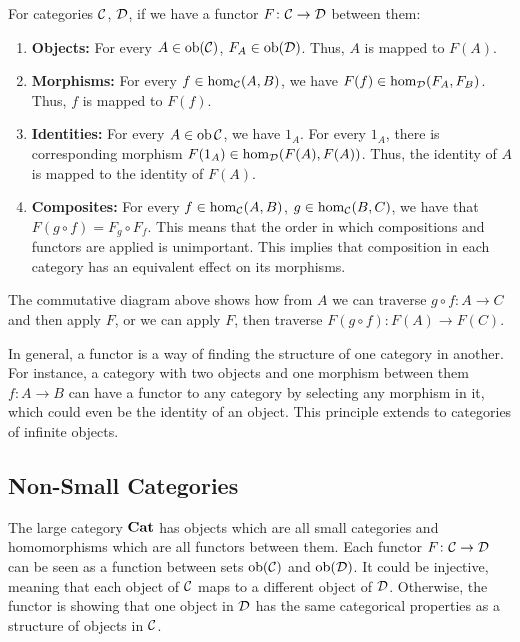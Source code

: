For categories $\mathcal{C}$, $\mathcal{D}$, if we have a functor $F
\colon \mathcal{C}\to\mathcal{D}$ between them:
\begin{enumerate}
        \item \textbf{Objects:} For every $A\in\operatorname{ob}(\mathcal{C})$, 
        $F_A\in\operatorname{ob}(\mathcal{D})$. Thus, $A$ is mapped to $F(A)$.

        \item \textbf{Morphisms:} For every $f\in\hom_{\mathcal{C}}(A,B)$, we
        have $F(f)\in\hom_{\mathcal{D}}(F_A,F_B)$. Thus, $f$ is mapped to $F(f)$.

        \item \textbf{Identities:} For every $A\in\operatorname{ob}{\mathcal{C}}$, we have
        $1_A$. For every $1_A$, there is corresponding morphism
        $F(1_A)\in\hom_{\mathcal{D}}(F(A),F(A))$. Thus, the identity of $A$ is
        mapped to the identity of $F(A)$.

        \item \textbf{Composites:} For every $f\in\hom_{\mathcal{C}}(A,B)$,
        $g\in\hom_{\mathcal{C}}(B,C)$, we have that $F{(g\circ f)} = F_g\circ
        F_f$. This means that the order in which compositions and functors are
        applied is unimportant. This implies that composition in each category
        has an equivalent effect on its morphisms.
\end{enumerate}
The commutative diagram above shows how from $A$ we can traverse $g\circ f
\colon A\to C$ and then apply $F$, or we can apply $F$, then traverse $F(g \circ
f) \colon F(A)\to F(C)$.

In general, a functor is a way of finding the structure of one category in
another.  For instance, a category with two objects and one morphism between
them $f \colon A\to B$ can have a functor to any category by selecting any
morphism in it, which could even be the identity of an object.  This principle
extends to categories of infinite objects.

\subsection{Non-Small Categories}

The large category $\operatorname{\mathbf{Cat}}$ has objects which are all small categories and
homomorphisms which are all functors between them.  Each functor $F \colon
\mathcal{C}\to\mathcal{D}$ can be seen as a function between sets
$\operatorname{ob}(\mathcal{C})$ and $\operatorname{ob}({\mathcal{D}})$.  It could be injective,
meaning that each object of $\mathcal{C}$ maps to a different object of
$\mathcal{D}$. Otherwise, the functor is showing that one object in $\mathcal{D}$
has the same categorical properties as a structure of objects in $\mathcal{C}$.

